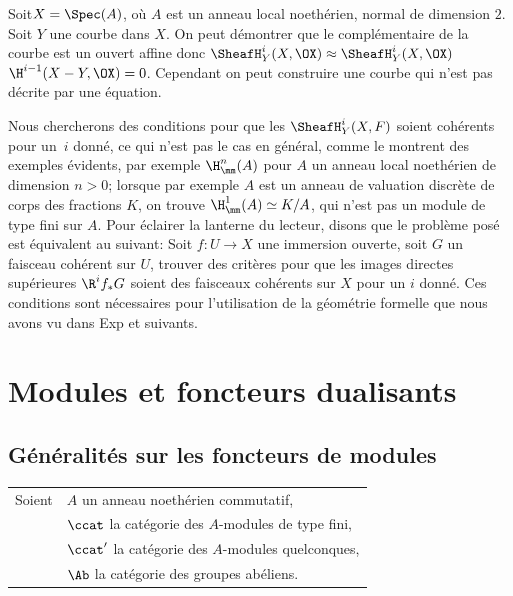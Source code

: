 \begin{exemple} \label{III.3.13}
Soit\pageoriginale $X=\Spec (A)$, o\`u $A$ est un anneau local noeth\'erien, normal de dimension $2$. Soit $Y$ une courbe dans $X$. On peut d\'emontrer que le compl\'ementaire de la courbe est un ouvert affine donc $\SheafH_Y^i(X, \OX) \approx \SheafH_Y^i(X, \OX)$ $\H^{i-1}(X-Y, \OX)=0$. Cependant on peut construire une courbe qui n'est pas d\'ecrite par une \'equation.
\end{exemple}

Nous chercherons des conditions pour que les $\SheafH_Y^i(X, F)$ soient coh\'erents pour un~$i$ donn\'e, ce qui n'est pas le cas en g\'en\'eral, comme le montrent des exemples \'evidents, par exemple $\H_\mm^n(A)$ pour $A$ un anneau local noeth\'erien de dimension $n>0$; lorsque par exemple $A$ est un anneau de valuation discr\`ete de corps des fractions $K$, on trouve $\H_\mm^1(A) \simeq K/A$, qui n'est pas un module de type fini sur $A$. Pour \'eclairer la lanterne du lecteur, disons que le probl\`eme pos\'e est \'equivalent au suivant: Soit $f:U\to X$ une immersion ouverte, soit $G$ un faisceau coh\'erent sur $U$, trouver des crit\`eres pour que les images directes sup\'erieures $\R^i f_* G$ soient des faisceaux coh\'erents sur $X$ pour un $i$ donn\'e. Ces conditions sont n\'ecessaires pour l'utilisation de la g\'eom\'etrie formelle que nous avons vu dans Exp  et \ignorespaces suivants.

\chapter{Modules et foncteurs dualisants} \label{IV}

\section{G\'en\'eralit\'es sur les foncteurs de modules} \label{IV.1}
\pageoriginale\ignorespaces
\hspace*{-3mm}
\begin{tabular}{ll}
Soient &$A$ un anneau noeth\'erien commutatif,\\
&$\ccat$ la cat\'egorie des $A$-modules de type fini,\\
&$\ccat'$ la cat\'egorie des $A$-modules quelconques,\\
&$\Ab$ la cat\'egorie des groupes ab\'eliens.{toto}\label{pIV.1}
\end{tabular}

